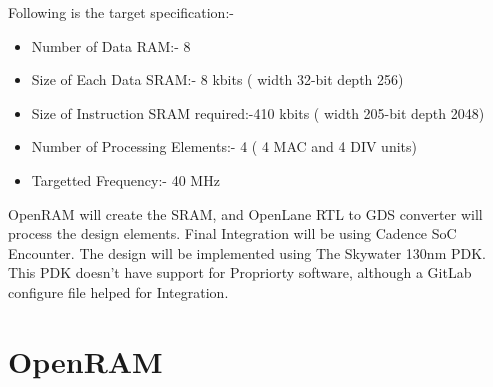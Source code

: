 Following is the target specification:-
\begin{itemize}
\itemsep0em 
\item Number of Data RAM:- 8
\item Size of Each Data SRAM:- 8 kbits ( width 32-bit depth 256)
\item Size of Instruction SRAM required:-410 kbits ( width 205-bit depth 2048)
\item Number of Processing Elements:- 4 ( 4 MAC and 4 DIV units)
\item Targetted Frequency:- 40 MHz
\end{itemize}
OpenRAM\cite{OpenRAM} will create the SRAM, and OpenLane\cite{OpenLane} RTL to GDS converter will process the design elements. Final Integration will be using Cadence SoC Encounter. The design will be implemented using The Skywater 130nm PDK. This PDK doesn't have support for Propriorty software, although a GitLab configure file helped for Integration\cite{skyADK}.

\section{OpenRAM}


